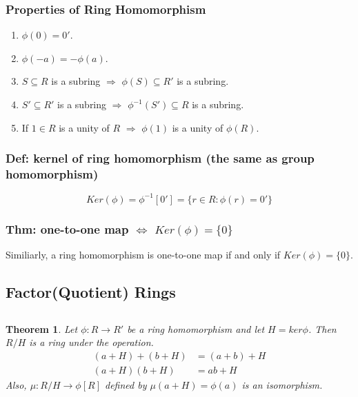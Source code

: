 \documentclass[11pt,a4paper]{article}
\newtheorem{theorem}{Theorem}
\begin{document}
\subsubsection{Properties of Ring Homomorphism}
\begin{enumerate}
    \item $\phi(0)=0'$.
    \item $\phi(-a)=-\phi(a)$.
    \item $S\subseteq R$ is a subring $\Rightarrow$ $\phi(S)\subseteq R'$ is a subring.
    \item $S'\subseteq R'$ is a subring $\Rightarrow$ $\phi^{-1}(S')\subseteq R$ is a subring.
    \item If $1\in R$ is a unity of $R$ $\Rightarrow$ $\phi(1)$ is a unity of $\phi(R)$.
\end{enumerate}

\subsubsection{Def: kernel of ring homomorphism (the same as group homomorphism)}
$$Ker(\phi)=\phi^{-1}[0']=\{r\in R: \phi(r)=0'\}$$

\subsubsection{Thm: one-to-one map $\Leftrightarrow$ $Ker(\phi)=\{0\}$}
Similiarly, a ring homomorphism is one-to-one map if and only if $Ker(\phi)=\{0\}$.

\subsection{Factor(Quotient) Rings}
\subsection{}
\begin{theorem}
    Let $\phi: R \rightarrow R'$ be a ring homomorphism and let $H=ker\phi$. Then $R/H$ is a ring under the operation.
    \begin{equation}
        \begin{aligned}
            (a+H)+(b+H)&=(a+b)+H\\
            (a+H)(b+H)&=ab+H
        \end{aligned}
        \nonumber
    \end{equation}
    Also, $\mu: R/H \rightarrow	\phi[R]$ defined by $\mu(a+H)=\phi(a)$ is an isomorphism.
\end{theorem}
\end{document}
